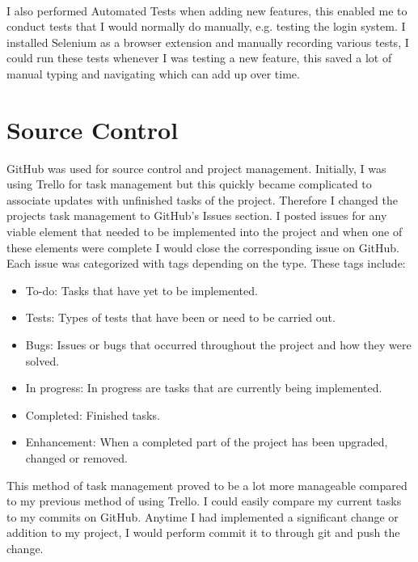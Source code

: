 \paragraph{}
I also performed Automated Tests when adding new features, this enabled me to conduct tests that I would normally do manually, e.g. testing the login system. I installed Selenium \cite{selenium} as a browser extension and manually recording various tests, I could run these tests whenever I was testing a new feature, this saved a lot of manual typing and navigating which can add up over time.
\section{Source Control}
GitHub was used for source control and project management. Initially, I was using Trello for task management but this quickly became complicated to associate updates with unfinished tasks of the project. Therefore I changed the projects task management to GitHub’s Issues section. I posted issues for any viable element that needed to be implemented into the project and when one of these elements were complete I would close the corresponding issue on GitHub. Each issue was categorized with tags depending on the type. These tags include:
\begin{itemize}
	\item To-do: Tasks that have yet to be implemented.
	\item Tests: Types of tests that have been or need to be carried out.
	\item Bugs: Issues or bugs that occurred throughout the project and how they were solved.
	\item In progress: In progress are tasks that are currently being implemented.
	\item Completed: Finished tasks.
	\item Enhancement: When a completed part of the project has been upgraded, changed or removed.
\end{itemize}
This method of task management proved to be a lot more manageable compared to my previous method of using Trello. I could easily compare my current tasks to my commits on GitHub. Anytime I had implemented a significant change or addition to my project, I would perform commit it to through git and push the change.

